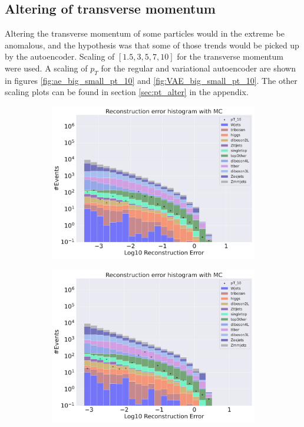 \subsection*{Altering of transverse momentum}
Altering the transverse momentum of some particles would in the extreme be anomalous, and the hypothesis was that some of those trends would be
picked up by the autoencoder. Scaling of $[1.5, 3, 5, 7, 10]$ for the transverse momentum were used. 
A scaling of $p_T$ for the regular and variational autoencoder are shown in figures \ref{fig:ae_big_small_pt_10}
 and \ref{fig:VAE_big_small_pt_10}. The other scaling plots can be found in section \ref{sec:pt_alter} in the appendix.




\begin{figure}[H]
    \centering
    \begin{subfigure}{.45\textwidth}
        \includegraphics[width=\textwidth]{Figures/AE_testing/small/b_data_recon_big_rm3_feats_sig_pT_10.pdf}
        \caption{}
        \label{fig:ae_small_pt_10}
    \end{subfigure}
    \hfill 
    \begin{subfigure}{.45\textwidth}
        \includegraphics[width=\textwidth]{Figures/AE_testing/big/b_data_recon_big_rm3_feats_sig_pT_10.pdf}

\end{subfigure}
\end{figure}
